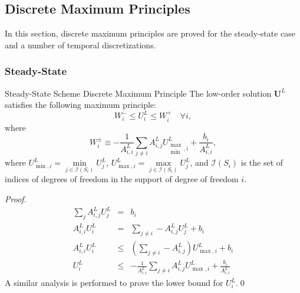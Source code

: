 \subsection{Discrete Maximum Principles}\label{DMP}
In this section, discrete maximum principles are proved for the steady-state
case and a number of temporal discretizations.
\subsubsection{Steady-State}
\begin{theorem}{Steady-State Scheme Discrete Maximum Principle}{}
The low-order solution $\mathbf{U}^L$ satisfies the following maximum principle:
\begin{equation}\label{ss_max_principle}
   W_i^-\leq U_i^L\leq W_i^+\quad\forall i,
\end{equation}
where
\begin{equation}
   W_i^\pm \equiv -\frac{1}{A^L_{i,i}}\sum\limits_{j\ne i} A^L_{i,j}
      U_{\substack{\max\\\min},i}^L + \frac{b_i}{A^L_{i,i}},
\end{equation}
where $U_{\min,i}^L = \min\limits_{j\in \mathcal{I}(S_i)}U_j^L$, $U_{\max,i}^L
= \max\limits_{j\in \mathcal{I}(S_i)}U_j^L$,
and $\mathcal{I}(S_i)$ is the set of indices of degrees of freedom in the support
of degree of freedom $i$.
\end{theorem}

\begin{proof}
\begin{eqnarray*}
	\sum\limits_j A^L_{i,j}U_j^L & = & b_i\\
	A^L_{i,i}U_i^L & = & \sum\limits_{j\ne i} -A^L_{i,j}U_j^L + b_i\\
	A^L_{i,i}U_i^L & \le & \left(\sum\limits_{j\ne i} -A^L_{i,j}\right)U_{\max,i}^L + b_i\\
   U_i^L & \le & -\frac{1}{A^L_{i,i}}\sum\limits_{j\ne i} A^L_{i,j}U_{\max,i}^L
      + \frac{b_i}{A^L_{i,i}}
\end{eqnarray*}
A similar analysis is performed to prove the lower bound for $U_i^L$.\qed
\end{proof}
